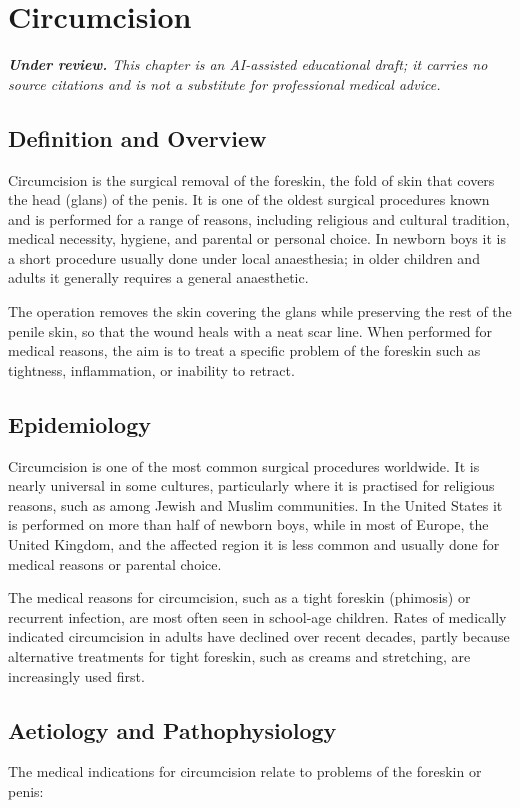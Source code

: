 \chapter{Circumcision}

\medskip
\noindent\textit{\textbf{Under review.} This chapter is an AI-assisted educational draft; it carries no source citations and is not a substitute for professional medical advice.}

\section*{Definition and Overview}
Circumcision is the surgical removal of the foreskin, the fold of skin that covers the head (glans) of the penis. It is one of the oldest surgical procedures known and is performed for a range of reasons, including religious and cultural tradition, medical necessity, hygiene, and parental or personal choice. In newborn boys it is a short procedure usually done under local anaesthesia; in older children and adults it generally requires a general anaesthetic.

The operation removes the skin covering the glans while preserving the rest of the penile skin, so that the wound heals with a neat scar line. When performed for medical reasons, the aim is to treat a specific problem of the foreskin such as tightness, inflammation, or inability to retract.

\section*{Epidemiology}
Circumcision is one of the most common surgical procedures worldwide. It is nearly universal in some cultures, particularly where it is practised for religious reasons, such as among Jewish and Muslim communities. In the United States it is performed on more than half of newborn boys, while in most of Europe, the United Kingdom, and the affected region it is less common and usually done for medical reasons or parental choice.

The medical reasons for circumcision, such as a tight foreskin (phimosis) or recurrent infection, are most often seen in school-age children. Rates of medically indicated circumcision in adults have declined over recent decades, partly because alternative treatments for tight foreskin, such as creams and stretching, are increasingly used first.

\section*{Aetiology and Pathophysiology}
The medical indications for circumcision relate to problems of the foreskin or penis:

